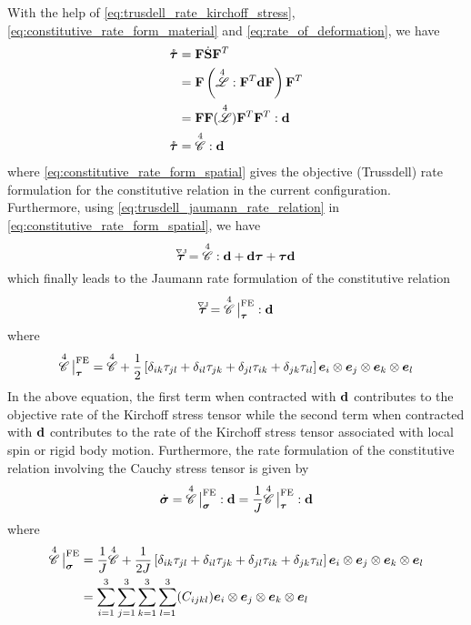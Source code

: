 With the help of \cref{eq:trusdell_rate_kirchoff_stress}, \cref{eq:constitutive_rate_form_material} and \cref{eq:rate_of_deformation}, we have
\begin{align}
    \nonumber \mathring{\bm{\tau}} 
    \nonumber &= \mathbf{F} \dot{\mathbf{S}} \mathbf{F}^{T} \\
    \nonumber &= \mathbf{F} \left(\overset{4}{\mathscr{L}} : \mathbf{F}^{T} \mathbf{d} \mathbf{F} \right) \mathbf{F}^{T} \\ 
    \nonumber &= \mathbf{F} \mathbf{F} (\overset{4}{\mathscr{L}}) \mathbf{F}^{T} \mathbf{F}^{T} : \mathbf{d} \\
    \mathring{\bm{\tau}} &= \overset{4}{\mathscr{C}} : \mathbf{d}
    \label{eq:constitutive_rate_form_spatial}
\end{align}
where \cref{eq:constitutive_rate_form_spatial} gives the objective (Trussdell) rate formulation for the constitutive relation in the current configuration. Furthermore, using \cref{eq:trusdell_jaumann_rate_relation} in \cref{eq:constitutive_rate_form_spatial}, we have 
\begin{equation}
    \accentset{\nabla{}\text{J}}{\bm{\tau}} = \overset{4}{\mathscr{C}} : \mathbf{d}  + \mathbf{d} \bm{\tau} + \bm{\tau} \mathbf{d}
\end{equation}
which finally leads to the Jaumann rate formulation of the constitutive relation
\begin{equation}
    \accentset{\nabla{}\text{J}}{\bm{\tau}} = {\overset{4}{\mathscr{C}}}{\,\big|}^{\text{FE}}_{\bm{\tau}} : \mathbf{d}
\end{equation}
where
\begin{equation}
    {\overset{4}{\mathscr{C}}}{\,\big|}^{\text{FE}}_{\bm{\tau}} = {\overset{4}{\mathscr{C}}} + 
    \frac{1}{2}\left[ \delta_{ik} {\tau}_{jl} + \delta_{il} {\tau}_{jk} + \delta_{jl} {\tau}_{ik} + \delta_{jk} {\tau}_{il} \right] \bm{e}_{i} \otimes \bm{e}_{j} \otimes \bm{e}_{k} \otimes \bm{e}_{l}
\end{equation}
In the above equation, the first term when contracted with \(\mathbf{d}\) contributes to the objective rate of the Kirchoff stress tensor while the second term when contracted with \(\mathbf{d}\) contributes to the rate of the Kirchoff stress tensor associated with local spin or rigid body motion. Furthermore, the rate formulation of the constitutive relation involving the Cauchy stress tensor is given by 
\begin{equation}
    \dot{\bm{\sigma}} = {\overset{4}{\mathscr{C}}}{\,\big|}^{\text{FE}}_{\bm{\sigma}} : \mathbf{d}
    = \frac{1}{J} {\overset{4}{\mathscr{C}}}{\,\big|}^{\text{FE}}_{\bm{\tau}}  : \mathbf{d}
\end{equation}
where
\begin{align}
    {\overset{4}{\mathscr{C}}}{\,\big|}^{\text{FE}}_{\bm{\sigma}}
    &= \frac{1}{J}{\overset{4}{\mathscr{C}}} + 
    \frac{1}{2J}\left[ \delta_{ik} {\tau}_{jl} + \delta_{il} {\tau}_{jk} + \delta_{jl} {\tau}_{ik} + \delta_{jk} {\tau}_{il} \right] \bm{e}_{i} \otimes \bm{e}_{j} \otimes \bm{e}_{k} \otimes \bm{e}_{l}\\
    &=\sum_{i=1}^{3}\sum_{j=1}^{3}\sum_{k=1}^{3}\sum_{l=1}^{3} ({C}_{ijkl}) \bm{e}_{i} \otimes \bm{e}_{j}  \otimes \bm{e}_{k}\otimes \bm{e}_{l}
    \label{eq:jaumann_spatial_tangent_stiffness}
\end{align}
